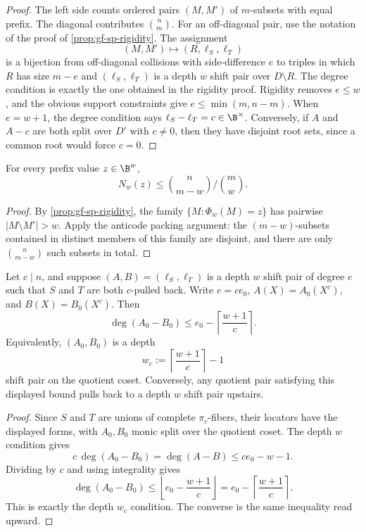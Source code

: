 \begin{proof}
The left side counts ordered pairs \((M,M')\) of \(m\)-subsets with equal
prefix.  The diagonal contributes \(\binom nm\).  For an off-diagonal pair,
use the notation of the proof of \cref{prop:gf-sp-rigidity}.  The assignment
\[
        (M,M')\longmapsto (R,\ell_S,\ell_T)
\]
is a bijection from off-diagonal collisions with side-difference \(e\) to
triples in which \(R\) has size \(m-e\) and \((\ell_S,\ell_T)\) is a depth
\(w\) shift pair over \(D\setminus R\).  The degree condition is exactly the
one obtained in the rigidity proof.  Rigidity removes \(e\le w\), and the
obvious support constraints give \(e\le\min(m,n-m)\).  When \(e=w+1\), the
degree condition says \(\ell_S-\ell_T=c\in\B^\times\).  Conversely, if \(A\)
and \(A-c\) are both split over \(D'\) with \(c\ne0\), then they have disjoint
root sets, since a common root would force \(c=0\).
\end{proof}

\begin{proposition}
\label{prop:gf-sp-packing}
For every prefix value \(z\in\B^w\),
\[
        N_w(z)\le \binom{n}{m-w}\Big/\binom{m}{w}.
\]
\end{proposition}

\begin{proof}
By \cref{prop:gf-sp-rigidity}, the family
\(\{M:\Phi_w(M)=z\}\) has pairwise \(|M\setminus M'|>w\).  Apply the
anticode packing argument: the \((m-w)\)-subsets contained in distinct members
of this family are disjoint, and there are only \(\binom{n}{m-w}\) such
subsets in total.
\end{proof}

\begin{proposition}
\label{prop:gf-sp-pullback}
Let \(c\mid n\), and suppose \((A,B)=(\ell_S,\ell_T)\) is a depth \(w\)
shift pair of degree \(e\) such that \(S\) and \(T\) are both
\(c\)-pulled back.  Write \(e=ce_0\), \(A(X)=A_0(X^c)\), and
\(B(X)=B_0(X^c)\).  Then
\[
        \deg(A_0-B_0)\le e_0-\left\lceil\frac{w+1}{c}\right\rceil.
\]
Equivalently, \((A_0,B_0)\) is a depth
\[
        w_c:=\left\lceil\frac{w+1}{c}\right\rceil-1
\]
shift pair on the quotient coset.  Conversely, any quotient pair satisfying
this displayed bound pulls back to a depth \(w\) shift pair upstairs.
\end{proposition}

\begin{proof}
Since \(S\) and \(T\) are unions of complete \(\pi_c\)-fibers, their locators
have the displayed forms, with \(A_0,B_0\) monic split over the quotient coset.
The depth \(w\) condition gives
\[
        c\,\deg(A_0-B_0)=\deg(A-B)\le ce_0-w-1.
\]
Dividing by \(c\) and using integrality gives
\[
        \deg(A_0-B_0)\le
        \left\lfloor e_0-\frac{w+1}{c}\right\rfloor
        =
        e_0-\left\lceil\frac{w+1}{c}\right\rceil.
\]
This is exactly the depth \(w_c\) condition.  The converse is the same
inequality read upward.
\end{proof}

